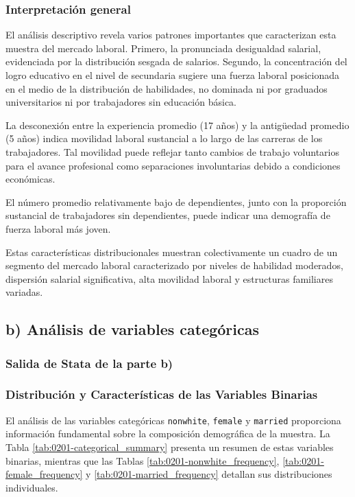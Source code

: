 \documentclass[12pt]{article}
\begin{document}
\subsubsection*{Interpretación general}

El análisis descriptivo revela varios patrones importantes que caracterizan esta muestra del mercado laboral. Primero, la pronunciada desigualdad salarial, evidenciada por la distribución sesgada de salarios. Segundo, la concentración del logro educativo en el nivel de secundaria sugiere una fuerza laboral posicionada en el medio de la distribución de habilidades, no dominada ni por graduados universitarios ni por trabajadores sin educación básica.

La desconexión entre la experiencia promedio (17 años) y la antigüedad promedio (5 años) indica movilidad laboral sustancial a lo largo de las carreras de los trabajadores. Tal movilidad puede reflejar tanto cambios de trabajo voluntarios para el avance profesional como separaciones involuntarias debido a condiciones económicas.

El número promedio relativamente bajo de dependientes, junto con la proporción sustancial de trabajadores sin dependientes, puede indicar una demografía de fuerza laboral más joven.

Estas características distribucionales muestran colectivamente un cuadro de un segmento del mercado laboral caracterizado por niveles de habilidad moderados, dispersión salarial significativa, alta movilidad laboral y estructuras familiares variadas.

\subsection*{b) Análisis de variables categóricas}

\subsubsection*{Salida de Stata de la parte b)}



\subsubsection*{Distribución y Características de las Variables Binarias}

El análisis de las variables categóricas \texttt{nonwhite}, \texttt{female} y \texttt{married} proporciona información fundamental sobre la composición demográfica de la muestra. La Tabla \ref{tab:0201-categorical_summary} presenta un resumen de estas variables binarias, mientras que las Tablas \ref{tab:0201-nonwhite_frequency}, \ref{tab:0201-female_frequency} y \ref{tab:0201-married_frequency} detallan sus distribuciones individuales.
\end{document}
